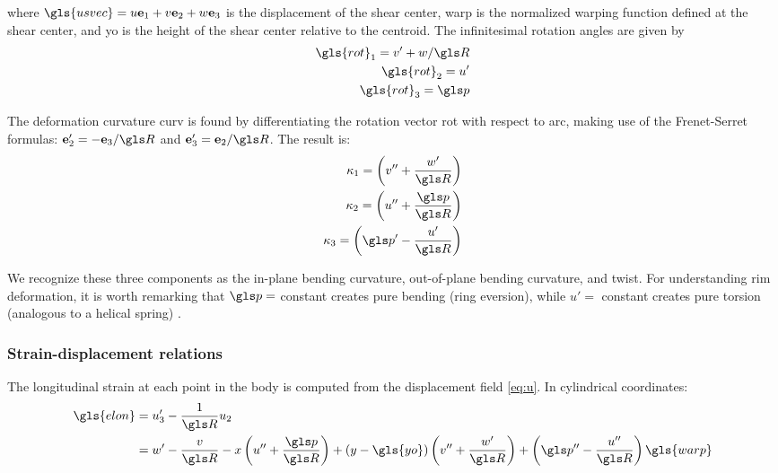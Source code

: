 \documentclass[\rootdir/thesis.tex]{subfiles}
\begin{document}
where $\gls{usvec} = u\eo + v\et + w\eh$ is the displacement of the shear center, \gls{warp} is the normalized warping function defined at the shear center, and \gls{yo} is the height of the shear center relative to the centroid. The infinitesimal rotation angles are given by
\begin{subequations}
\label{eq:omega}
\begin{align}
\gls{rot}_1 = v' + w/\R\\
\gls{rot}_2 = u'\\
\gls{rot}_3 = \p
\end{align}
\end{subequations}

The deformation curvature \gls{curv} is found by differentiating the rotation vector \gls{rot} with respect to \gls{arc}, making use of the Frenet-Serret formulas: $\et' = -\eh/\R$ and $\eh' = \et/\R$. The result is:
\begin{subequations}
\label{eq:kappa}
\begin{align}
\kappa_1 = \left( v'' + \frac{w'}{\R} \right) \label{eq:kappa1}\\
\kappa_2 = \left( u'' + \frac{\p}{\R} \right) \label{eq:kappa2}\\
\kappa_3 = \left( \p' - \frac{u'}{\R} \right) \label{eq:kappa3}
\end{align}
\end{subequations}

We recognize these three components as the in-plane bending curvature, out-of-plane bending curvature, and twist. For understanding rim deformation, it is worth remarking that $\p=$ constant creates pure bending (ring eversion), while $u'=$ constant creates pure torsion (analogous to a helical spring) \cite{PapadopoulosPriv}.

\subsubsection{Strain-displacement relations}

The longitudinal strain at each point in the body is computed from the displacement field \eqref{eq:u}. In cylindrical coordinates:
\begin{align}
\label{eq:strain}
\begin{split}
\gls{elon} &= u_3' - \frac{1}{\R} u_2\\
           &= w' - \frac{v}{\R} - \x\left(u'' + \frac{\p}{\R}\right) +
                 	(\y-\gls{yo})\left(v'' + \frac{w'}{\R}\right) +
                 	\left(\p'' - \frac{u''}{\R}\right)\gls{warp}
\end{split}
\end{align}
\end{document}
